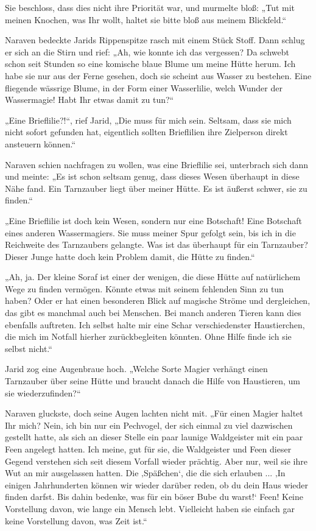 Sie beschloss, dass dies nicht ihre Priorität war, und murmelte bloß: „Tut mit meinen Knochen, was Ihr wollt, haltet sie bitte bloß aus meinem Blickfeld.“

Naraven bedeckte Jarids Rippenspitze rasch mit einem Stück Stoff. Dann schlug er sich an die Stirn und rief: „Ah, wie konnte ich das vergessen? Da schwebt schon seit Stunden so eine komische blaue Blume um meine Hütte herum. Ich habe sie nur aus der Ferne gesehen, doch sie scheint aus Wasser zu bestehen. Eine fliegende wässrige Blume, in der Form einer Wasserlilie, welch Wunder der Wassermagie! Habt Ihr etwas damit zu tun?“

„Eine Brieflilie?!“, rief Jarid, „Die muss für mich sein. Seltsam, dass sie mich nicht sofort gefunden hat, eigentlich sollten Brieflilien ihre Zielperson direkt ansteuern können.“

Naraven schien nachfragen zu wollen, was eine Brieflilie sei, unterbrach sich dann und meinte: „Es ist schon seltsam genug, dass dieses Wesen überhaupt in diese Nähe fand. Ein Tarnzauber liegt über meiner Hütte. Es ist äußerst schwer, sie zu finden.“

„Eine Brieflilie ist doch kein Wesen, sondern nur eine Botschaft! Eine Botschaft eines anderen Wassermagiers. Sie muss meiner Spur gefolgt sein, bis ich in die Reichweite des Tarnzaubers gelangte. Was ist das überhaupt für ein Tarnzauber? Dieser Junge hatte doch kein Problem damit, die Hütte zu finden.“

„Ah, ja. Der kleine Soraf ist einer der wenigen, die diese Hütte auf natürlichem Wege zu finden vermögen. Könnte etwas mit seinem fehlenden Sinn zu tun haben? Oder er hat einen besonderen Blick auf magische Ströme und dergleichen, das gibt es manchmal auch bei Menschen. Bei manch anderen Tieren kann dies ebenfalls auftreten. Ich selbst halte mir eine Schar verschiedenster Haustierchen, die mich im Notfall hierher zurückbegleiten könnten. Ohne Hilfe finde ich sie selbst nicht.“

Jarid zog eine Augenbraue hoch. „Welche Sorte Magier verhängt einen Tarnzauber über seine Hütte und braucht danach die Hilfe von Haustieren, um sie wiederzufinden?“

Naraven gluckste, doch seine Augen lachten nicht mit. „Für einen Magier haltet Ihr mich? Nein, ich bin nur ein Pechvogel, der sich einmal zu viel dazwischen gestellt hatte, als sich an dieser Stelle ein paar launige Waldgeister mit ein paar Feen angelegt hatten. Ich meine, gut für sie, die Waldgeister und Feen dieser Gegend verstehen sich seit diesem Vorfall wieder prächtig. Aber nur, weil sie ihre Wut an mir ausgelassen hatten. Die ‚Späßchen‘, die die sich erlauben ... ‚In einigen Jahrhunderten können wir wieder darüber reden, ob du dein Haus wieder finden darfst. Bis dahin bedenke, was für ein böser Bube du warst!‘ Feen! Keine Vorstellung davon, wie lange ein Mensch lebt. Vielleicht haben sie einfach gar keine Vorstellung davon, was Zeit ist.“

